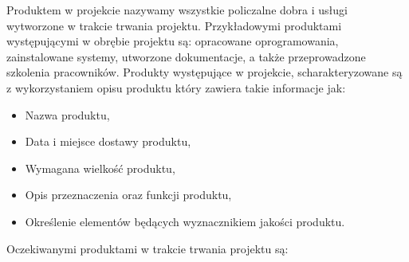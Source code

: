 \documentclass[12pt,a4paper]{article}
\begin{document}
Produktem w projekcie nazywamy wszystkie policzalne dobra i usługi wytworzone w trakcie trwania projektu. Przykładowymi produktami występującymi w obrębie projektu są: opracowane oprogramowania, zainstalowane systemy, utworzone dokumentacje, a także przeprowadzone szkolenia pracowników. Produkty występujące w projekcie, scharakteryzowane są z wykorzystaniem opisu produktu który zawiera takie informacje jak: 
\begin{itemize}
    \item Nazwa produktu,
    \item Data i miejsce dostawy produktu, 
    \item Wymagana wielkość produktu, 
    \item Opis przeznaczenia oraz funkcji produktu, 
    \item Określenie elementów będących wyznacznikiem jakości produktu.
\end{itemize}


Oczekiwanymi produktami w trakcie trwania projektu są: 
\end{document}

